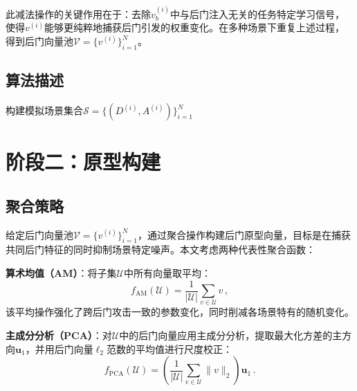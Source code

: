 此减法操作的关键作用在于：去除$v_b^{(i)}$中与后门注入无关的任务特定学习信号，使得$v^{(i)}$能够更纯粹地捕获后门引发的权重变化。在多种场景下重复上述过程，得到后门向量池$\mathcal{V} = \{v^{(i)}\}_{i=1}^{N}$。

\subsection{算法描述}

\begin{algorithm}[htbp]
\caption{后门模拟（阶段一）}
\label{alg:stage1}
\;
构建模拟场景集合$\mathcal{S} = \{(D^{(i)}, A^{(i)})\}_{i=1}^{N}$\;
\end{algorithm}

\section{阶段二：原型构建}

\subsection{聚合策略}

给定后门向量池$\mathcal{V} = \{v^{(i)}\}_{i=1}^{N}$，通过聚合操作构建后门原型向量，目标是在捕获共同后门特征的同时抑制场景特定噪声。本文考虑两种代表性聚合函数：

\textbf{算术均值（AM）}：将子集$\mathcal{U}$中所有向量取平均：
\begin{equation}
f_{\text{AM}}(\mathcal{U}) = \frac{1}{|\mathcal{U}|} \sum_{v \in \mathcal{U}} v \, ,
\end{equation}
该平均操作强化了跨后门攻击一致的参数变化，同时削减各场景特有的随机变化。

\textbf{主成分分析（PCA）}：对$\mathcal{U}$中的后门向量应用主成分分析，提取最大化方差的主方向$\mathbf{u}_1$，并用后门向量$\ell_2$范数的平均值进行尺度校正：
\begin{equation}
f_{\text{PCA}}(\mathcal{U}) = \left(\frac{1}{|\mathcal{U}|} \sum_{v \in \mathcal{U}} \|v\|_2\right) \mathbf{u}_1 \, .
\end{equation}

